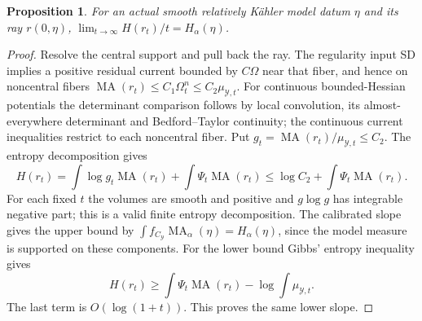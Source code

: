 \documentclass[11pt]{article}
\newcommand{\MA}{\operatorname{MA}}
\newtheorem{proposition}[theorem]{Proposition}
\theoremstyle{remark}\newtheorem{remark}[theorem]{Remark}
\begin{document}
\begin{proposition}\label{prop:model-slope}
For an actual smooth relatively K\"ahler model datum $\eta$ and
its ray $r(0,\eta)$,
$\lim_{t\to\infty}H(r_t)/t=H_\alpha(\eta)$.
\end{proposition}
\begin{proof}
Resolve the central support and pull back the ray. The regularity
input SD implies a positive residual current bounded by $C\Omega$
near that fiber, and hence on noncentral fibers
$\MA(r_t)\leq C_1\Omega_t^n\leq C_2\mu_{\mathcal Y,t}$.
For continuous bounded-Hessian potentials the determinant comparison
follows by local convolution, its almost-everywhere determinant and
Bedford--Taylor continuity; the continuous current inequalities
restrict to each noncentral fiber.
Put $g_t=\MA(r_t)/\mu_{\mathcal Y,t}\leq C_2$. The entropy
decomposition gives
\[
 H(r_t)=\int\log g_t\MA(r_t)+\int\Psi_t\MA(r_t)
       \leq\log C_2+\int\Psi_t\MA(r_t).
\]
For each fixed $t$ the volumes are smooth and positive and
$g\log g$ has integrable negative part; this is a valid finite
entropy decomposition. The calibrated slope gives the upper bound
by $\int f_{C_{\mathcal Y}}\MA_\alpha(\eta)=H_\alpha(\eta)$,
since the model measure is supported on these components.
For the lower bound Gibbs' entropy inequality gives
\[
 H(r_t)\geq\int\Psi_t\MA(r_t)
              -\log\int\mu_{\mathcal Y,t}.
\]
The last term is $O(\log(1+t))$. This proves the same lower slope.
\end{proof}
\end{document}
